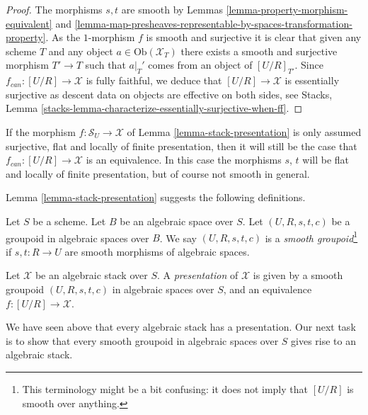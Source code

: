 \begin{proof}
The morphisms $s, t$ are smooth by
Lemmas \ref{lemma-property-morphism-equivalent} and
\ref{lemma-map-presheaves-representable-by-spaces-transformation-property}.
As the $1$-morphism $f$ is smooth and
surjective it is clear that given any scheme $T$ and any object
$a \in \text{Ob}(\mathcal{X}_T)$ there exists a smooth and surjective
morphism $T' \to T$ such that $a|_T'$ comes from an object of
$[U/R]_{T'}$. Since $f_{can} : [U/R] \to \mathcal{X}$
is fully faithful, we deduce that
$[U/R] \to \mathcal{X}$ is essentially surjective as
descent data on objects are effective on both sides, see
Stacks, Lemma \ref{stacks-lemma-characterize-essentially-surjective-when-ff}.
\end{proof}

\begin{remark}
\label{remark-flat-fp-presentation}
If the morphism $f : \mathcal{S}_U \to \mathcal{X}$ of
Lemma \ref{lemma-stack-presentation}
is only assumed surjective, flat and locally of finite presentation, then
it will still be the case that $f_{can} : [U/R] \to \mathcal{X}$ is an
equivalence. In this case the morphisms $s$, $t$ will be flat and
locally of finite presentation, but of course not smooth in general.
\end{remark}

\noindent
Lemma \ref{lemma-stack-presentation}
suggests the following definitions.

\begin{definition}
\label{definition-smooth-groupoid}
Let $S$ be a scheme. Let $B$ be an algebraic space over $S$.
Let $(U, R, s, t, c)$ be a groupoid in algebraic spaces over $B$.
We say $(U, R, s, t, c)$ is a {\it smooth groupoid}\footnote{This terminology
might be a bit confusing: it does not imply that $[U/R]$ is smooth
over anything.}
if $s, t : R \to U$ are smooth morphisms of algebraic spaces.
\end{definition}

\begin{definition}
\label{definition-presentation}
Let $\mathcal{X}$ be an algebraic stack over $S$.
A {\it presentation} of $\mathcal{X}$ is given by a smooth groupoid
$(U, R, s, t, c)$ in algebraic spaces over $S$, and an
equivalence $f : [U/R] \to \mathcal{X}$.
\end{definition}

\noindent
We have seen above that every algebraic stack has a presentation.
Our next task is to show that every smooth groupoid in algebraic
spaces over $S$ gives rise to an algebraic stack.



